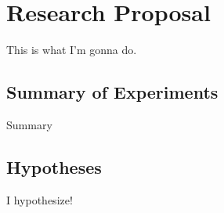 \chapter{Research Proposal}
\label{ch:proposal}

This is what I'm gonna do.

\section{Summary of Experiments}
\label{sec:summary}

Summary

\section{Hypotheses}
\label{sec:hypotheses}

I hypothesize!


